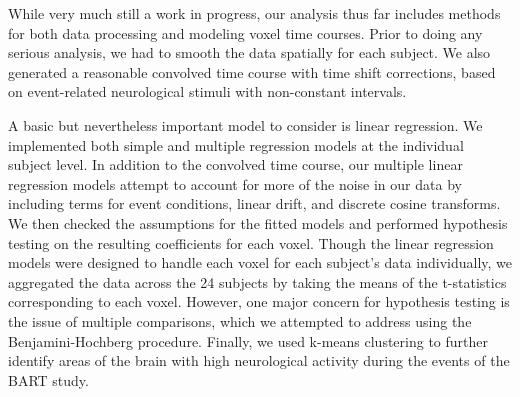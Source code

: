 \par \indent While very much still a work in progress, our analysis thus far 
includes methods for both data processing and modeling voxel time courses. 
Prior to doing any serious analysis, we had to smooth the data spatially for 
each subject. We also generated a reasonable convolved time course with time 
shift corrections, based on event-related neurological stimuli with 
non-constant intervals. 

\par A basic but nevertheless important model to consider is linear regression. 
We implemented both simple and multiple regression models at the individual 
subject level. In addition to the convolved time course, our multiple linear 
regression models attempt to account for more of the noise in our data by 
including terms for event conditions, linear drift, and discrete cosine 
transforms. We then checked the assumptions for the fitted models and performed 
hypothesis testing on the resulting coefficients for each voxel. Though the 
linear regression models were designed to handle each voxel for each subject's 
data individually, we aggregated the data across the 24 subjects by taking the 
means of the t-statistics corresponding to each voxel. However, one major concern 
for hypothesis testing is the issue of multiple comparisons, which we attempted to 
address using the Benjamini-Hochberg procedure. Finally, we used k-means 
clustering to further identify areas of the brain with high neurological activity 
during the events of the BART study. 



